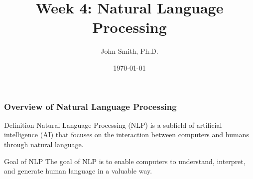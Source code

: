 \documentclass[aspectratio=169]{beamer}
\title{Week 4: Natural Language Processing}
\author{John Smith, Ph.D.}
\date{\today}
\begin{document}
\frame{\titlepage}

\begin{frame}[fragile]
    \titlepage
\end{frame}

\begin{frame}[fragile]
    \frametitle{Overview of Natural Language Processing}
    
    \begin{block}{Definition}
        Natural Language Processing (NLP) is a subfield of artificial intelligence (AI) that focuses on the interaction between computers and humans through natural language.
    \end{block}
    
    \begin{block}{Goal of NLP}
        The goal of NLP is to enable computers to understand, interpret, and generate human language in a valuable way.
    \end{block}
\end{frame}
\end{document}
